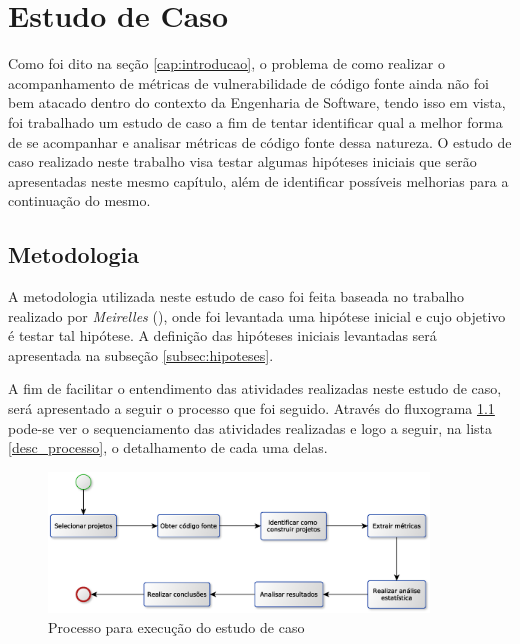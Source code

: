 \chapter{Estudo de Caso} \label{estudodecaso}

Como foi dito na seção \ref{cap:introducao}, o problema de como realizar o
acompanhamento de métricas de vulnerabilidade de código fonte ainda não foi bem
atacado dentro do contexto da Engenharia de Software, tendo isso em vista,
foi trabalhado um estudo de caso a fim de tentar identificar qual a melhor forma
de se acompanhar e analisar métricas de código fonte dessa natureza. O estudo
de caso realizado neste trabalho visa testar algumas hipóteses iniciais que serão apresentadas
neste mesmo capítulo, além de identificar possíveis melhorias para a continuação
do mesmo.

\section{Metodologia} \label{sec:metodologia}

A metodologia utilizada neste estudo de caso foi feita baseada no trabalho
realizado por \emph{Meirelles} (\citeyear{meirelles2013}), onde foi levantada
uma hipótese inicial e cujo objetivo é testar tal hipótese. A definição das
hipóteses iniciais levantadas será apresentada na subseção \ref{subsec:hipoteses}.

A fim de facilitar o entendimento das atividades realizadas neste estudo de
caso, será apresentado a seguir o processo que foi seguido. Através do
fluxograma \ref{fig:processo_estudo_de_caso} pode-se ver o sequenciamento das
atividades realizadas e logo a seguir, na lista \ref{desc_processo}, o
detalhamento de cada uma delas.

\begin{figure}[h]
  \centering
  \includegraphics[width=0.9\textwidth]
      {figuras/estudo_de_caso_processo.eps}
  \caption{Processo para execução do estudo de caso}
  \label{fig:processo_estudo_de_caso}
\end{figure}

